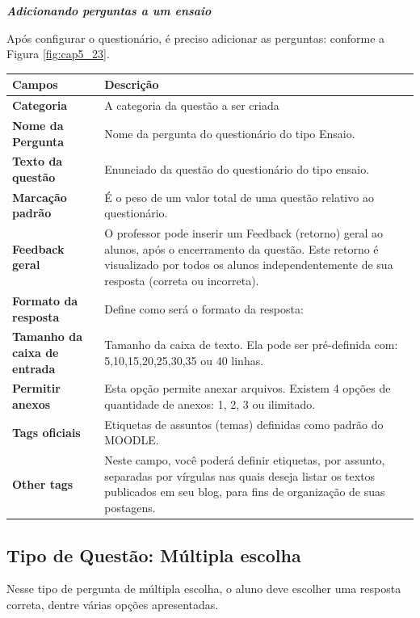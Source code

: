  \textit{\textbf{Adicionando perguntas a um ensaio}}

Após configurar o questionário, é preciso adicionar as perguntas: conforme a Figura \ref{fig:cap5_23}.

\begin{longtable}{p{6cm}|p{9cm}}
     \hline
     \rowcolor[rgb]{0.8,0.8,0.8} \textbf{Campos} &  \textbf{Descrição}\\\hline
    \textbf{Categoria} & A categoria da questão a ser criada \\\hline
    \textbf{Nome da Pergunta} & Nome da pergunta do questionário do tipo Ensaio. \\\hline
    \textbf{Texto da questão} & Enunciado da questão do questionário do tipo ensaio. \\\hline
    \textbf{Marcação padrão} &  É o peso de um valor total de uma questão relativo ao questionário. \\\hline
    \textbf{Feedback geral} &  O professor  pode inserir um  Feedback (retorno)  geral  ao alunos,  após o encerramento da questão. Este retorno é visualizado por todos os alunos independentemente de sua resposta (correta ou incorreta). \\\hline
    \textbf{Formato da resposta} & Define como será o formato da resposta: \\\hline
    \textbf{Tamanho da caixa de entrada} &  Tamanho da caixa de texto. Ela pode ser pré-definida com:
5,10,15,20,25,30,35 ou 40 linhas.
 \\\hline
    \textbf{Permitir anexos} & Esta opção permite anexar arquivos. Existem 4 opções de quantidade de anexos: 1, 2, 3 ou ilimitado.\\\hline
    \textbf{Tags oficiais} & Etiquetas de assuntos (temas) definidas como padrão do MOODLE. \\\hline
    \textbf{Other tags} &  Neste campo,  você poderá definir  etiquetas,  por assunto, separadas por vírgulas nas quais deseja listar os textos publicados em seu blog, para fins de organização de suas postagens. \\\hline
\end{longtable}%

\subsection{Tipo de Questão: Múltipla escolha}
Nesse tipo de pergunta de múltipla escolha, o aluno deve escolher uma resposta correta, dentre várias opções apresentadas.

